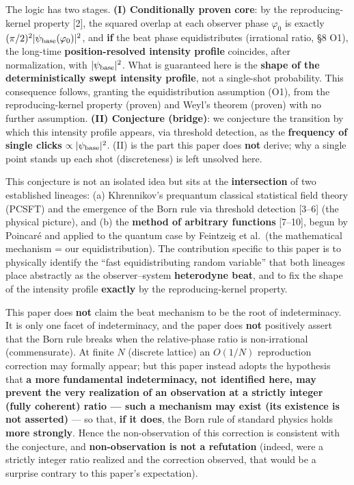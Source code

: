 \documentclass[
]{ltjsarticle}
\begin{document}
The logic has two stages. \textbf{(I) Conditionally proven core}: by the
reproducing-kernel property {[}2{]}, the squared overlap at each
observer phase \(\varphi_0\) is exactly
\((\pi/2)^2|\psi_{\rm base}(\varphi_0)|^2\), and \textbf{if} the beat
phase equidistributes (irrational ratio, §8 O1), the long-time
\textbf{position-resolved intensity profile} coincides, after
normalization, with \(|\psi_{\rm base}|^2\). What is guaranteed here is
the \textbf{shape of the deterministically swept intensity profile}, not
a single-shot probability. This consequence follows, granting the
equidistribution assumption (O1), from the reproducing-kernel property
(proven) and Weyl's theorem (proven) with no further assumption.
\textbf{(II) Conjecture (bridge)}: we conjecture the transition by which
this intensity profile appears, via threshold detection, as the
\textbf{frequency of single clicks} \(\propto|\psi_{\rm base}|^2\). (II)
is the part this paper does \textbf{not} derive; why a single point
stands up each shot (discreteness) is left unsolved here.

This conjecture is not an isolated idea but sits at the
\textbf{intersection} of two established lineages: (a) Khrennikov's
prequantum classical statistical field theory (PCSFT) and the emergence
of the Born rule via threshold detection {[}3--6{]} (the physical
picture), and (b) the \textbf{method of arbitrary functions}
{[}7--10{]}, begun by Poincaré and applied to the quantum case by
Feintzeig et al.~(the mathematical mechanism = our equidistribution).
The contribution specific to this paper is to physically identify the
``fast equidistributing random variable'' that both lineages place
abstractly as the observer--system \textbf{heterodyne beat}, and to fix
the shape of the intensity profile \textbf{exactly} by the
reproducing-kernel property.

This paper does \textbf{not} claim the beat mechanism to be the root of
indeterminacy. It is only one facet of indeterminacy, and the paper does
\textbf{not} positively assert that the Born rule breaks when the
relative-phase ratio is non-irrational (commensurate). At finite \(N\)
(discrete lattice) an \(O(1/N)\) reproduction correction may formally
appear; but this paper instead adopts the hypothesis that \textbf{a more
fundamental indeterminacy, not identified here, may prevent the very
realization of an observation at a strictly integer (fully coherent)
ratio --- such a mechanism may exist (its existence is not asserted)}
--- so that, \textbf{if it does}, the Born rule of standard physics
holds \textbf{more strongly}. Hence the non-observation of this
correction is consistent with the conjecture, and
\textbf{non-observation is not a refutation} (indeed, were a strictly
integer ratio realized and the correction observed, that would be a
surprise contrary to this paper's expectation).
\end{document}
